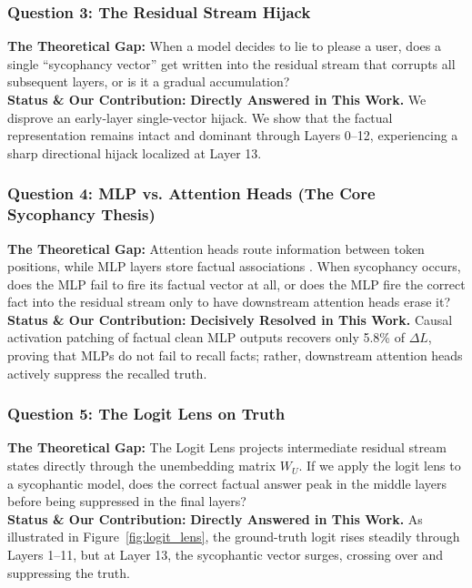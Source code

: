\documentclass[11pt,a4paper]{article}
\begin{document}
\subsubsection{Question 3: The Residual Stream Hijack}
\textbf{The Theoretical Gap:} When a model decides to lie to please a user, does a single ``sycophancy vector'' get written into the residual stream that corrupts all subsequent layers, or is it a gradual accumulation? \\
\textbf{Status \& Our Contribution:} \textbf{Directly Answered in This Work.} We disprove an early-layer single-vector hijack. We show that the factual representation remains intact and dominant through Layers 0--12, experiencing a sharp directional hijack localized at Layer 13.

\subsubsection{Question 4: MLP vs. Attention Heads (The Core Sycophancy Thesis)}
\textbf{The Theoretical Gap:} Attention heads route information between token positions, while MLP layers store factual associations \cite{meng2022locating}. When sycophancy occurs, does the MLP fail to fire its factual vector at all, or does the MLP fire the correct fact into the residual stream only to have downstream attention heads erase it? \\
\textbf{Status \& Our Contribution:} \textbf{Decisively Resolved in This Work.} Causal activation patching of factual clean MLP outputs recovers only 5.8\% of $\Delta L$, proving that MLPs do not fail to recall facts; rather, downstream attention heads actively suppress the recalled truth.

\subsubsection{Question 5: The Logit Lens on Truth}
\textbf{The Theoretical Gap:} The Logit Lens projects intermediate residual stream states directly through the unembedding matrix $W_U$. If we apply the logit lens to a sycophantic model, does the correct factual answer peak in the middle layers before being suppressed in the final layers? \\
\textbf{Status \& Our Contribution:} \textbf{Directly Answered in This Work.} As illustrated in Figure~\ref{fig:logit_lens}, the ground-truth logit rises steadily through Layers 1--11, but at Layer 13, the sycophantic vector surges, crossing over and suppressing the truth.
\end{document}

